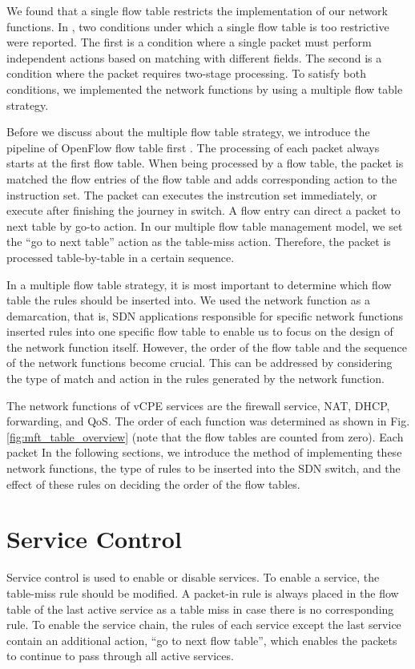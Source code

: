 We found that a single flow table restricts the implementation of our network functions. In \cite{multiple-flow-table}, two conditions under which a single flow table is too restrictive were reported. The first is a condition where a single packet must perform independent actions based on matching with different fields. The second is a condition where the packet requires two-stage processing. To satisfy both conditions, we implemented the network functions by using a multiple flow table strategy.

Before we discuss about the multiple flow table strategy, we introduce the pipeline of OpenFlow flow table first \cite{openflow-spec}. The processing of each packet always starts at the first flow table. When being processed by a flow table, the packet is matched the flow entries of the flow table and adds corresponding action to the instruction set. The packet can executes the instrcution set immediately, or execute after finishing the journey in switch. A flow entry can direct a packet to next table by go-to action. In our multiple flow table management model, we set the ``go to next table'' action as the table-miss action. Therefore, the packet is processed table-by-table in a certain sequence.

In a multiple flow table strategy, it is most important to determine which flow table the rules should be inserted into. We used the network function as a demarcation, that is, SDN applications responsible for specific network functions inserted rules into one specific flow table to enable us to focus on the design of the network function itself. However, the order of the flow table and the sequence of the network functions become crucial. This can be addressed by considering the type of match and action in the rules generated by the network function.

The network functions of vCPE services are the firewall service, NAT, DHCP, forwarding, and QoS. The order of each function was determined as shown in Fig. \ref{fig:mft_table_overview} (note that the flow tables are counted from zero). Each packet In the following sections, we introduce the method of implementing these network functions, the type of rules to be inserted into the SDN switch, and the effect of these rules on deciding the order of the flow tables.



\section{Service Control} \label{sec:service_control}
Service control is used to enable or disable services. To enable a service, the table-miss rule should be modified. A packet-in rule is always placed in the flow table of the last active service as a table miss in case there is no corresponding rule. To enable the service chain, the rules of each service except the last service contain an additional action, ``go to next flow table'', which enables the packets to continue to pass through all active services.

